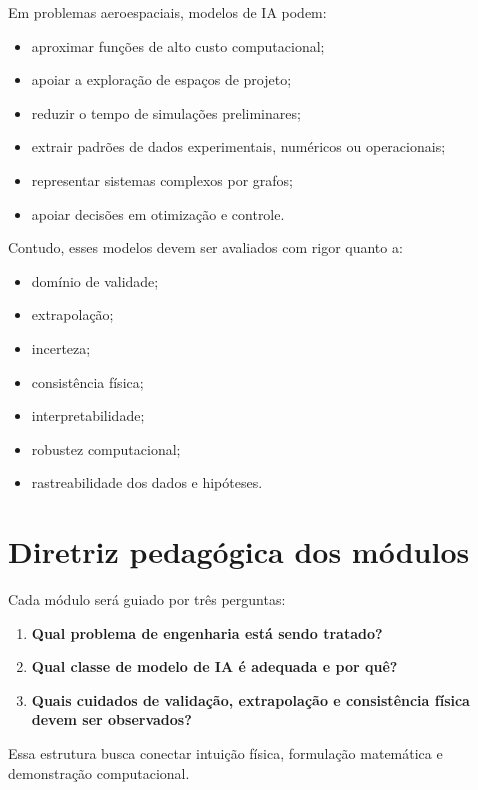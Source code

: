 \documentclass[
  brazilian,
  a4paper,
  DIV=11,
  numbers=noendperiod]{scrreprt}
\providecommand{\tightlist}{%
  \setlength{\itemsep}{0pt}\setlength{\parskip}{0pt}}
\begin{document}
Em problemas aeroespaciais, modelos de IA podem:

\begin{itemize}
\tightlist
\item
  aproximar funções de alto custo computacional;
\item
  apoiar a exploração de espaços de projeto;
\item
  reduzir o tempo de simulações preliminares;
\item
  extrair padrões de dados experimentais, numéricos ou operacionais;
\item
  representar sistemas complexos por grafos;
\item
  apoiar decisões em otimização e controle.
\end{itemize}

Contudo, esses modelos devem ser avaliados com rigor quanto a:

\begin{itemize}
\tightlist
\item
  domínio de validade;
\item
  extrapolação;
\item
  incerteza;
\item
  consistência física;
\item
  interpretabilidade;
\item
  robustez computacional;
\item
  rastreabilidade dos dados e hipóteses.
\end{itemize}

\section{Diretriz pedagógica dos
módulos}\label{diretriz-pedaguxf3gica-dos-muxf3dulos}

Cada módulo será guiado por três perguntas:

\begin{enumerate}
\def\labelenumi{\arabic{enumi}.}
\tightlist
\item
  \textbf{Qual problema de engenharia está sendo tratado?}
\item
  \textbf{Qual classe de modelo de IA é adequada e por quê?}
\item
  \textbf{Quais cuidados de validação, extrapolação e consistência
  física devem ser observados?}
\end{enumerate}

Essa estrutura busca conectar intuição física, formulação matemática e
demonstração computacional.
\end{document}
